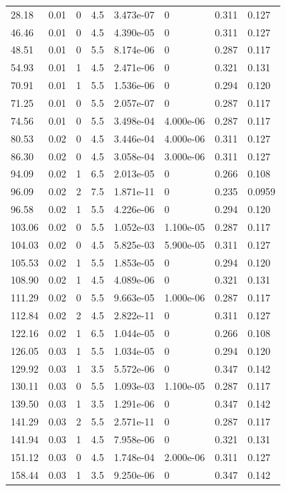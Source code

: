 \documentclass[preview]{standalone}
\begin{document}
{{\begin{tabular}{L{1.2cm}C{1.2cm} C{0.3cm}C{0.5cm} C{1.4cm}C{1.4cm} C{1.4cm}C{1.4cm}}
  28.18  &  0.01  & 0     & 4.5 &  3.473e-07  & 0  & 0.311 &  0.127   \\ 
  46.46  &  0.01  & 0     & 4.5 &  4.390e-05  & 0  & 0.311 &  0.127   \\ 
  48.51  &  0.01  & 0     & 5.5 &  8.174e-06  & 0  & 0.287 &  0.117   \\ 
  54.93  &  0.01  & 1     & 4.5 &  2.471e-06  & 0  & 0.321 &  0.131   \\ 
  70.91  &  0.01  & 1     & 5.5 &  1.536e-06  & 0  & 0.294 &  0.120   \\ 
  71.25  &  0.01  & 0     & 5.5 &  2.057e-07  & 0  & 0.287 &  0.117   \\ 
  74.56  &  0.01  & 0     & 5.5 &  3.498e-04  & 4.000e-06  & 0.287 &  0.117   \\ 
  80.53  &  0.02  & 0     & 4.5 &  3.446e-04  & 4.000e-06  & 0.311 &  0.127   \\ 
  86.30  &  0.02  & 0     & 4.5 &  3.058e-04  & 3.000e-06  & 0.311 &  0.127   \\ 
  94.09  &  0.02  & 1     & 6.5 &  2.013e-05  & 0  & 0.266 &  0.108   \\ 
  96.09  &  0.02  & 2     & 7.5 &  1.871e-11  & 0  & 0.235 &  0.0959   \\ 
  96.58  &  0.02  & 1     & 5.5 &  4.226e-06  & 0  & 0.294 &  0.120   \\ 
  103.06  &  0.02  & 0     & 5.5 &  1.052e-03  & 1.100e-05  & 0.287 &  0.117   \\ 
  104.03  &  0.02  & 0     & 4.5 &  5.825e-03  & 5.900e-05  & 0.311 &  0.127   \\ 
  105.53  &  0.02  & 1     & 5.5 &  1.853e-05  & 0  & 0.294 &  0.120   \\ 
  108.90  &  0.02  & 1     & 4.5 &  4.089e-06  & 0  & 0.321 &  0.131   \\ 
  111.29  &  0.02  & 0     & 5.5 &  9.663e-05  & 1.000e-06  & 0.287 &  0.117   \\ 
  112.84  &  0.02  & 2     & 4.5 &  2.822e-11  & 0  & 0.311 &  0.127   \\ 
  122.16  &  0.02  & 1     & 6.5 &  1.044e-05  & 0  & 0.266 &  0.108   \\ 
  126.05  &  0.03  & 1     & 5.5 &  1.034e-05  & 0  & 0.294 &  0.120   \\ 
  129.92  &  0.03  & 1     & 3.5 &  5.572e-06  & 0  & 0.347 &  0.142   \\ 
  130.11  &  0.03  & 0     & 5.5 &  1.093e-03  & 1.100e-05  & 0.287 &  0.117   \\ 
  139.50  &  0.03  & 1     & 3.5 &  1.291e-06  & 0  & 0.347 &  0.142   \\ 
  141.29  &  0.03  & 2     & 5.5 &  2.571e-11  & 0  & 0.287 &  0.117   \\ 
  141.94  &  0.03  & 1     & 4.5 &  7.958e-06  & 0  & 0.321 &  0.131   \\ 
  151.12  &  0.03  & 0     & 4.5 &  1.748e-04  & 2.000e-06  & 0.311 &  0.127   \\ 
  158.44  &  0.03  & 1     & 3.5 &  9.250e-06  & 0  & 0.347 &  0.142   \\ 
\hline 
\end{tabular} 

}}
\end{document}
